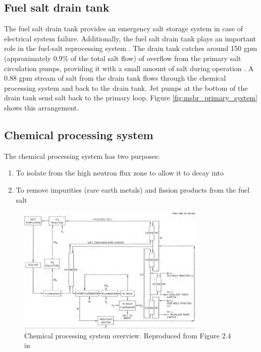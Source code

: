 \subsection{Fuel salt drain tank}
The fuel salt drain tank provides an emergency salt storage system in case of
electrical system failure. Additionally, the fuel salt drain tank plays an important role in
the fuel-salt reprocessing system \cite{robertson_conceptual_1971}. The drain tank catches around 150 gpm (approximately 0.9\% of the total salt flow) of
overflow from the primary salt circulation pumps, providing it with a small
amount of salt during operation \cite{robertson_conceptual_1971}. A 0.88 gpm
stream of salt from the drain tank flows through the chemical processing system
and back to the drain tank. Jet pumps at the bottom of the drain tank send salt
back to the primary loop. Figure \ref{fig:msbr_primary_system} shows this
arrangement.

\subsection{Chemical processing system}
The chemical processing system has two purposes:
\begin{enumerate}
    \item To isolate  from the high neutron flux zone to allow it to decay into 
    \item To remove impurities (rare earth metals) and fission products from the fuel salt
\end{enumerate}

\begin{figure}[htpb]
    \centering
    \includegraphics[width=0.8\textwidth]{figs/ch4/chemical_processing_system.png}
    \caption{Chemical processing system overview. Reproduced from Figure 2.4 in \cite{robertson_conceptual_1971}}
    \label{fig:}
\end{figure}

